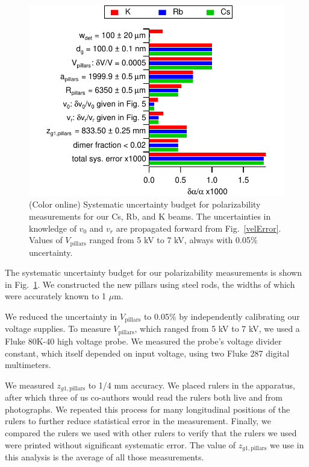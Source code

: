 \documentclass[twocolumn,prl,showpacs,superscriptaddress]{revtex4-1}   %
\newcommand{\figref}[1]{Fig.~\ref{#1}}
\begin{document}
\begin{figure}
\includegraphics[width=\linewidth,keepaspectratio]{displayPolErrors.pdf}
\caption{\label{polError}(Color online) Systematic uncertainty budget for polarizability measurements for our Cs, Rb, and K beams.
The uncertainties in knowledge of $v_0$ and $v_r$ are propagated forward from \figref{velError}.
Values of $V_{\mathrm{pillars}}$ ranged from 5 kV to 7 kV, always with 0.05\% uncertainty.}
\end{figure}

The systematic uncertainty budget for our polarizability measurements is shown in \figref{polError}. 
We constructed the new pillars using steel rods, the widths of which were accurately known to 1 $\mu$m. 

We reduced the uncertainty in $V_{\mathrm{pillars}}$ to 0.05\% by independently calibrating our voltage supplies. To measure $V_{\mathrm{pillars}}$, which ranged from 5 kV to 7 kV, we used a Fluke 80K-40 high voltage probe. We measured the probe's voltage divider constant, which itself depended on input voltage, using two Fluke 287 digital multimeters.

We measured $z_{g1,\mathrm{pillars}}$ to 1/4 mm accuracy. We placed rulers in the apparatus, after which three of us co-authors would read the rulers both live and from photographs. We repeated this process for many longitudinal positions of the rulers to further reduce statistical error in the measurement. Finally, we compared the rulers we used with other rulers to verify that the rulers we used were printed without significant systematic error. The value of $z_{g1,\mathrm{pillars}}$ we use in this analysis is the average of all those measurements. 
\end{document}
